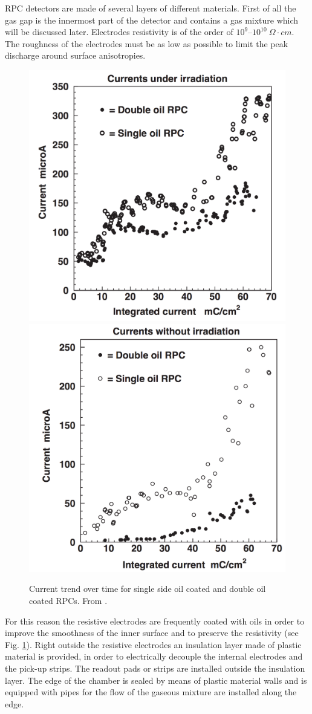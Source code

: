 RPC detectors are made of several layers of different materials.
First of all the gas gap is the innermost part of the detector and contains a gas mixture which will be discussed later.
Electrodes resistivity is of the order of $10^9 – 10^10\ \Omega \cdot cm$.
The roughness of the electrodes must be as low as possible to limit the peak discharge around surface anisotropies.


\begin{figure}[!t]
\begin{center}
\includegraphics[width=0.47\linewidth]{Chapters/Performance/Figs/oil_irradiation.pdf}
\includegraphics[width=0.47\linewidth]{Chapters/Performance/Figs/oil_no_irradiation.pdf}
\caption{Current trend over time for single side oil coated and double oil coated RPCs. From \cite{aliceRPC:2004}.}
\label{fig:RPCoil}
\end{center}
\end{figure}

For this reason the resistive electrodes are frequently coated with oils in order to improve the smoothness of the inner surface and to preserve the resistivity (see Fig. \ref{fig:RPCoil}).
Right outside the resistive electrodes an insulation layer made of plastic material is provided, in order to electrically decouple the internal electrodes and the pick-up strips.
The readout pads or strips are installed outside the insulation layer.
The edge of the chamber is sealed by means of plastic material walls and is equipped with pipes for the flow of the gaseous mixture are installed along the edge.

